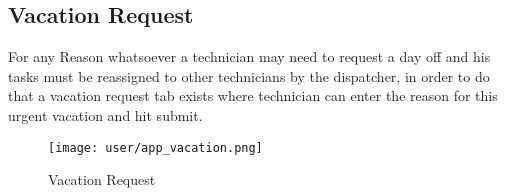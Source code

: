 \subsection{Vacation Request}
	For any Reason whatsoever a technician may need to request a day off and his tasks must be reassigned to other technicians by the dispatcher, in order to do that a vacation request tab exists where technician can enter the reason for this urgent vacation and hit submit.
	\begin{figure}[ht]
		\centering
		\texttt{[image: user/app\_vacation.png]}
		\caption{Vacation Request}
	\end{figure}